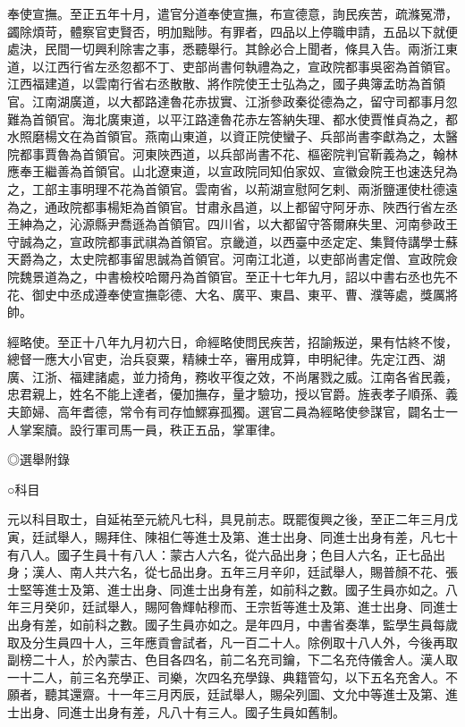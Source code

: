 \begin{pinyinscope}
 奉使宣撫。至正五年十月，遣官分道奉使宣撫，布宣德意，詢民疾苦，疏滌冤滯，蠲除煩苛，體察官吏賢否，明加黜陟。有罪者，四品以上停職申請，五品以下就便處決，民間一切興利除害之事，悉聽舉行。其餘必合上聞者，條具入告。兩浙江東道，以江西行省左丞忽都不丁、吏部尚書何執禮為之，宣政院都事吳密為首領官。江西福建道，以雲南行省右丞散散、將作院使王士弘為之，國子典簿孟昉為首領官。江南湖廣道，以大都路達魯花赤拔實、江浙參政秦從德為之，留守司都事月忽難為首領官。海北廣東道，以平江路達魯花赤左答納失理、都水使賈惟貞為之，都水照磨楊文在為首領官。燕南山東道，以資正院使蠻子、兵部尚書李獻為之，太醫院都事賈魯為首領官。河東陜西道，以兵部尚書不花、樞密院判官靳義為之，翰林應奉王繼善為首領官。山北遼東道，以宣政院同知伯家奴、宣徽僉院王也速迭兒為之，工部主事明理不花為首領官。雲南省，以荊湖宣慰阿乞剌、兩浙鹽運使杜德遠為之，通政院都事楊矩為首領官。甘肅永昌道，以上都留守阿牙赤、陜西行省左丞王紳為之，沁源縣尹喬遜為首領官。四川省，以大都留守答爾麻失里、河南參政王守誠為之，宣政院都事武祺為首領官。京畿道，以西臺中丞定定、集賢侍講學士蘇天爵為之，太史院都事留思誠為首領官。河南江北道，以吏部尚書定僧、宣政院僉院魏景道為之，中書檢校哈爾丹為首領官。至正十七年九月，詔以中書右丞也先不花、御史中丞成遵奉使宣撫彰德、大名、廣平、東昌、東平、曹、濮等處，獎厲將帥。



 經略使。至正十八年九月初六日，命經略使問民疾苦，招諭叛逆，果有怙終不悛，總督一應大小官吏，治兵裒粟，精練士卒，審用成算，申明紀律。先定江西、湖廣、江浙、福建諸處，並力掎角，務收平復之效，不尚屠戮之威。江南各省民義，忠君親上，姓名不能上達者，優加撫存，量才驗功，授以官爵。旌表孝子順孫、義夫節婦、高年耆德，常令有司存恤鰥寡孤獨。選官二員為經略使參謀官，闢名士一人掌案牘。設行軍司馬一員，秩正五品，掌軍律。



 ◎選舉附錄



 ○科目



 元以科目取士，自延祐至元統凡七科，具見前志。既罷復興之後，至正二年三月戊寅，廷試舉人，賜拜住、陳祖仁等進士及第、進士出身、同進士出身有差，凡七十有八人。國子生員十有八人：蒙古人六名，從六品出身；色目人六名，正七品出身；漢人、南人共六名，從七品出身。五年三月辛卯，廷試舉人，賜普顏不花、張士堅等進士及第、進士出身、同進士出身有差，如前科之數。國子生員亦如之。八年三月癸卯，廷試舉人，賜阿魯輝帖穆而、王宗哲等進士及第、進士出身、同進士出身有差，如前科之數。國子生員亦如之。是年四月，中書省奏準，監學生員每歲取及分生員四十人，三年應貢會試者，凡一百二十人。除例取十八人外，今後再取副榜二十人，於內蒙古、色目各四名，前二名充司鑰，下二名充侍儀舍人。漢人取一十二人，前三名充學正、司樂，次四名充學錄、典籍管勾，以下五名充舍人。不願者，聽其還齋。十一年三月丙辰，廷試舉人，賜朵列圖、文允中等進士及第、進士出身、同進士出身有差，凡八十有三人。國子生員如舊制。




\end{pinyinscope}
